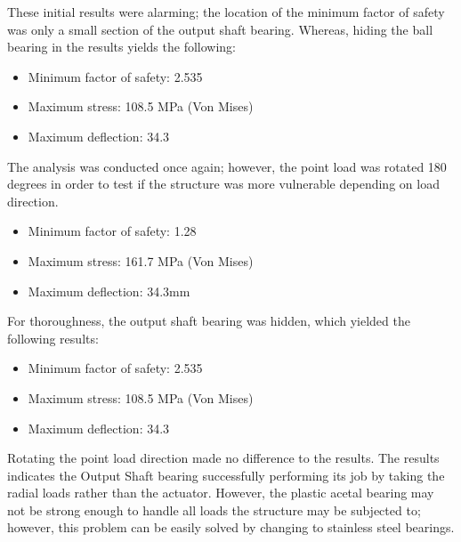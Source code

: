 These initial results were alarming; the location of the minimum factor of safety was only a small section of the output shaft bearing. Whereas, hiding the ball bearing in the results yields the following:
  \begin{itemize}
     \item Minimum factor of safety: 2.535
     \item Maximum stress: 108.5 MPa (Von Mises)
     \item Maximum deflection: 34.3
 \end{itemize}



The analysis was conducted once again; however, the point load was rotated 180 degrees in order to test if the structure was more vulnerable depending on load direction.
 \begin{itemize}
     \item Minimum factor of safety: 1.28
     \item Maximum stress: 161.7 MPa (Von Mises)
     \item Maximum deflection: 34.3mm
 \end{itemize}
 
For thoroughness, the output shaft bearing was hidden, which yielded the following results:
  \begin{itemize}
     \item Minimum factor of safety: 2.535
     \item Maximum stress: 108.5 MPa (Von Mises)
     \item Maximum deflection: 34.3
 \end{itemize}
 
Rotating the point load direction made no difference to the results. 
The results indicates the Output Shaft bearing successfully performing its job by taking the radial loads rather than the actuator. However, the plastic acetal bearing may not be strong enough to handle all loads the structure may be subjected to; however, this problem can be easily solved by changing to stainless steel bearings. 



